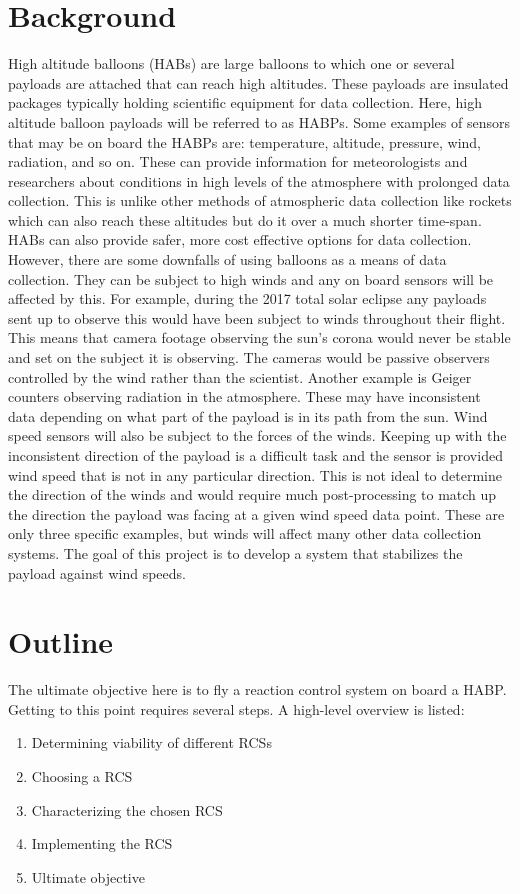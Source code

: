 \section{Background}
High altitude balloons (HABs) are large balloons to which one or several payloads are attached that can reach high altitudes. These payloads are insulated packages typically holding scientific equipment for data collection. Here, high altitude balloon payloads will be referred to as HABPs. Some examples of sensors that may be on board the HABPs are: temperature, altitude, pressure, wind, radiation, and so on. These can provide information for meteorologists and researchers about conditions in high levels of the atmosphere with prolonged data collection. This is unlike other methods of atmospheric data collection like rockets which can also reach these altitudes but do it over a much shorter time-span. HABs can also provide safer, more cost effective options for data collection. However, there are some downfalls of using balloons as a means of data collection. They can be subject to high winds and any on board sensors will be affected by this. For example, during the 2017 total solar eclipse any payloads sent up to observe this would have been subject to winds throughout their flight. This means that camera footage observing the sun's corona would never be stable and set on the subject it is observing. The cameras would be passive observers controlled by the wind rather than the scientist. Another example is Geiger counters observing radiation in the atmosphere. These may have inconsistent data depending on what part of the payload is in its path from the sun. Wind speed sensors will also be subject to the forces of the winds. Keeping up with the inconsistent direction of the payload is a difficult task and the sensor is provided wind speed that is not in any particular direction. This is not ideal to determine the direction of the winds and would require much post-processing to match up the direction the payload was facing at a given wind speed data point. These are only three specific examples, but winds will affect many other data collection systems. The goal of this project is to develop a system that stabilizes the payload against wind speeds.
\section{Outline}
The ultimate objective here is to fly a reaction control system on board a HABP. Getting to this point requires several steps. A high-level overview is listed:
\begin{enumerate}
\item Determining viability of different RCSs
\item Choosing a RCS
\item Characterizing the chosen RCS
\item Implementing the RCS
\item Ultimate objective
\end{enumerate}
